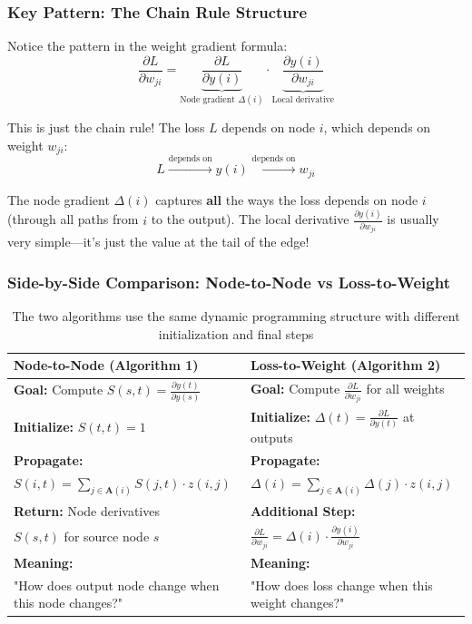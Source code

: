\begin{notechapter}
\subsubsection{Key Pattern: The Chain Rule Structure}

Notice the pattern in the weight gradient formula:
$$\frac{\partial L}{\partial w_{ji}} = \underbrace{\frac{\partial L}{\partial y(i)}}_{\text{Node gradient } \Delta(i)} \cdot \underbrace{\frac{\partial y(i)}{\partial w_{ji}}}_{\text{Local derivative}}$$

This is just the chain rule! The loss $L$ depends on node $i$, which depends on weight $w_{ji}$:
$$L \xrightarrow{\text{depends on}} y(i) \xrightarrow{\text{depends on}} w_{ji}$$

The node gradient $\Delta(i)$ captures \textbf{all} the ways the loss depends on node $i$ (through all paths from $i$ to the output). The local derivative $\frac{\partial y(i)}{\partial w_{ji}}$ is usually very simple—it's just the value at the tail of the edge!

\subsubsection{Side-by-Side Comparison: Node-to-Node vs Loss-to-Weight}

\begin{table}[h]
\centering
\begin{tabular}{|p{}|p{}|}
\hline
\textbf{Node-to-Node (Algorithm 1)} & \textbf{Loss-to-Weight (Algorithm 2)} \\
\hline
\hline
\textbf{Goal:} Compute $S(s,t) = \frac{\partial y(t)}{\partial y(s)}$ & \textbf{Goal:} Compute $\frac{\partial L}{\partial w_{ji}}$ for all weights \\
\hline
\textbf{Initialize:} $S(t,t) = 1$ & \textbf{Initialize:} $\Delta(t) = \frac{\partial L}{\partial y(t)}$ at outputs \\
\hline
\textbf{Propagate:} & \textbf{Propagate:} \\
$S(i,t) = \sum_{j \in \mathbf{A}(i)} S(j,t) \cdot z(i,j)$ & $\Delta(i) = \sum_{j \in \mathbf{A}(i)} \Delta(j) \cdot z(i,j)$ \\
\hline
\textbf{Return:} Node derivatives & \textbf{Additional Step:} \\
$S(s,t)$ for source node $s$ & $\frac{\partial L}{\partial w_{ji}} = \Delta(i) \cdot \frac{\partial y(i)}{\partial w_{ji}}$ \\
\hline
\textbf{Meaning:} & \textbf{Meaning:} \\
"How does output node change when this node changes?" & "How does loss change when this weight changes?" \\
\hline
\end{tabular}
\caption{The two algorithms use the same dynamic programming structure with different initialization and final steps}
\end{table}


\end{notechapter}
